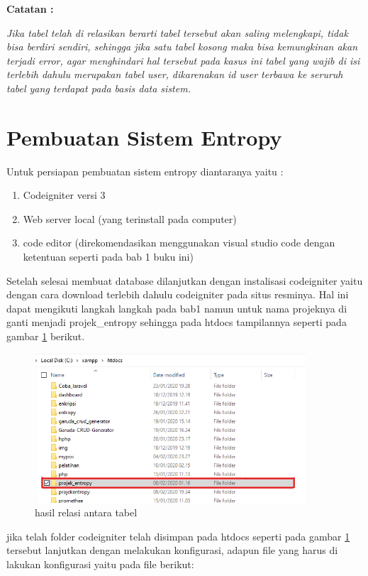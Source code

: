 \textbf{Catatan :}\par
\textit{Jika tabel telah di relasikan berarti tabel tersebut akan saling melengkapi, tidak bisa berdiri sendiri, sehingga jika satu tabel kosong maka bisa kemungkinan akan terjadi error, agar menghindari hal tersebut pada kasus ini tabel yang wajib di isi terlebih dahulu merupakan tabel user, dikarenakan id user terbawa ke seruruh tabel yang terdapat pada basis data sistem.} 

\pagebreak
\section{Pembuatan Sistem Entropy}

Untuk persiapan pembuatan sistem entropy diantaranya yaitu :
\begin{enumerate}
\item Codeigniter versi 3
\item Web server local (yang terinstall pada computer)
\item code editor (direkomendasikan menggunakan visual studio code dengan ketentuan seperti pada bab 1 buku ini)
\end{enumerate}
	Setelah selesai membuat database dilanjutkan dengan instalisasi codeigniter yaitu dengan cara download terlebih dahulu codeigniter pada situs resminya. Hal ini dapat mengikuti langkah langkah pada bab1 namun untuk nama projeknya di ganti menjadi projek\_entropy sehingga pada htdocs tampilannya seperti pada gambar \ref{crs1} berikut.

\begin{figure}[!htbp]
	\centerline{\includegraphics[width=0.90\textwidth]{figures/crs/1.png}}
	\caption{hasil relasi antara tabel}
	\label{crs1}
\end{figure}

jika telah folder codeigniter telah disimpan pada htdocs seperti pada gambar \ref{crs1} tersebut lanjutkan dengan melakukan konfigurasi, adapun file yang harus di lakukan konfigurasi yaitu pada file berikut:

